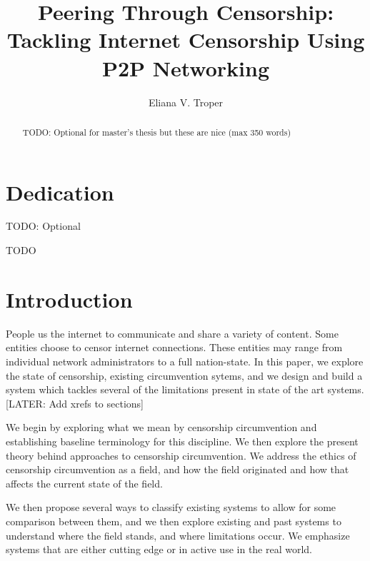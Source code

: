 \documentclass[12pt]{report}
\title{Peering Through Censorship:\\Tackling Internet Censorship Using P2P Networking}
\author{Eliana V. Troper}
\begin{document}

\maketitle    %

\begin{abstract}
TODO: Optional for master's thesis but these are nice (max 350 words)
\end{abstract}


\chapter*{Dedication}

TODO: Optional


TODO

\tableofcontents

\listoffigures  %
\listoftables   %

\newpage


\chapter{Introduction}

People us the internet to communicate and share a variety of content. Some entities choose to censor internet connections. These entities may range from individual network administrators to a full nation-state. In this paper, we explore the state of censorship, existing circumvention sytems, and we design and build a system which tackles several of the limitations present in state of the art systems. [LATER: Add xrefs to sections]

We begin by exploring what we mean by censorship circumvention and establishing baseline terminology for this discipline. We then explore the present theory behind approaches to censorship circumvention. We address the ethics of censorship circumvention as a field, and how the field originated and how that affects the current state of the field.

We then propose several ways to classify existing systems to allow for some comparison between them, and we then explore existing and past systems to understand where the field stands, and where limitations occur. We emphasize systems that are either cutting edge or in active use in the real world.
\end{document}
